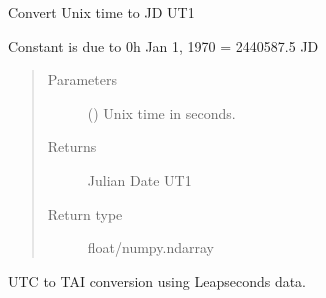 \documentclass[letterpaper,10pt,english]{sphinxmanual}
\begin{document}

\begin{fulllineitems}
\label{\detokenize{modules/dpt_tools:dpt_tools.unix_to_jd}}
Convert Unix time to JD UT1

Constant is due to 0h Jan 1, 1970 = 2440587.5 JD
\begin{quote}\begin{description}
\item[{Parameters}] \leavevmode
{} () \textendash{} Unix time in seconds.

\item[{Returns}] \leavevmode
Julian Date UT1

\item[{Return type}] \leavevmode
float/numpy.ndarray

\end{description}\end{quote}

\end{fulllineitems}


\begin{fulllineitems}
\label{\detokenize{modules/dpt_tools:dpt_tools.utc2tai}}
UTC to TAI conversion using Leapseconds data.

\end{fulllineitems}

\end{document}
